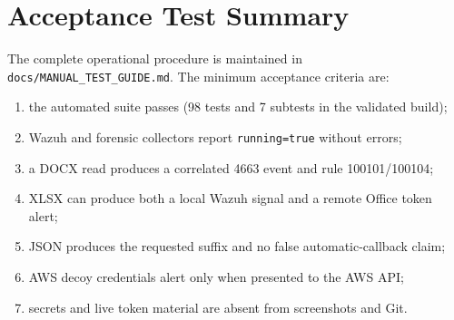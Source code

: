 \documentclass{rapportENSIAS}
\begin{document}
\chapter{Acceptance Test Summary}
The complete operational procedure is maintained in
\texttt{docs/MANUAL\_TEST\_GUIDE.md}. The minimum acceptance criteria are:
\begin{enumerate}[label=\arabic*.]
  \item the automated suite passes (98 tests and 7 subtests in the validated build);
  \item Wazuh and forensic collectors report \texttt{running=true} without errors;
  \item a DOCX read produces a correlated 4663 event and rule 100101/100104;
  \item XLSX can produce both a local Wazuh signal and a remote Office token alert;
  \item JSON produces the requested suffix and no false automatic-callback claim;
  \item AWS decoy credentials alert only when presented to the AWS API;
  \item secrets and live token material are absent from screenshots and Git.
\end{enumerate}
\end{document}
